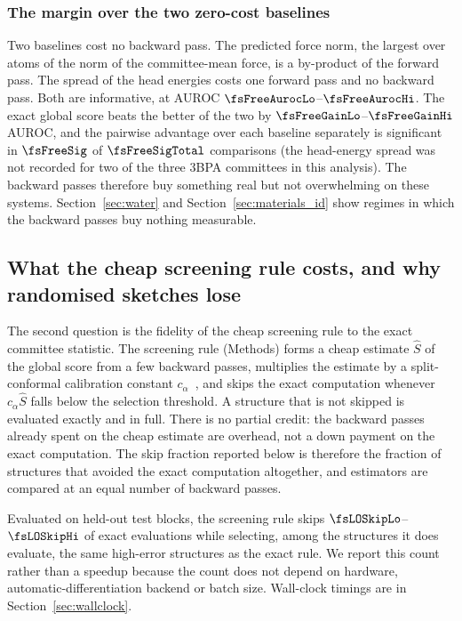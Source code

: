 \subsubsection{The margin over the two zero-cost baselines}

Two baselines cost no backward pass. The predicted force norm, the largest over
atoms of the norm of the committee-mean force, is a by-product of the forward
pass. The spread of the head energies costs one forward pass and no backward
pass. Both are informative, at AUROC $\fsFreeAurocLo$--$\fsFreeAurocHi$. The
exact global score beats the better of the two by $\fsFreeGainLo$--$\fsFreeGainHi$
AUROC, and the pairwise advantage over each baseline separately is significant
in $\fsFreeSig$ of $\fsFreeSigTotal$ comparisons (the head-energy spread was not
recorded for two of the three 3BPA committees in this analysis). The backward
passes therefore buy something real but not overwhelming on these systems.
Section~\ref{sec:water} and Section~\ref{sec:materials_id} show regimes in which
the backward passes buy nothing measurable.

\subsection{What the cheap screening rule costs, and why randomised sketches lose}
\label{sec:screeningresults}

The second question is the fidelity of the cheap screening rule to the exact
committee statistic. The screening rule (Methods) forms a cheap estimate
$\hat{S}$ of the global score from a few backward passes, multiplies the
estimate by a split-conformal calibration constant
$c_\alpha$~\citep{vovk2005algorithmic,lei2018distribution}, and skips the exact
computation whenever $c_\alpha\hat{S}$ falls below the selection threshold. A
structure that is not skipped is evaluated exactly and in full. There is no
partial credit: the backward passes already spent on the cheap estimate are
overhead, not a down payment on the exact computation. The skip fraction
reported below is therefore the fraction of structures that avoided the exact
computation altogether, and estimators are compared at an equal number of
backward passes.

Evaluated on held-out test blocks, the screening rule skips
$\fsLOSkipLo$--$\fsLOSkipHi$ of exact evaluations while selecting, among the
structures it does evaluate, the same high-error structures as the exact rule.
We report this count rather than a speedup because the count does not depend on
hardware, automatic-differentiation backend or batch size. Wall-clock timings
are in Section~\ref{sec:wallclock}.

